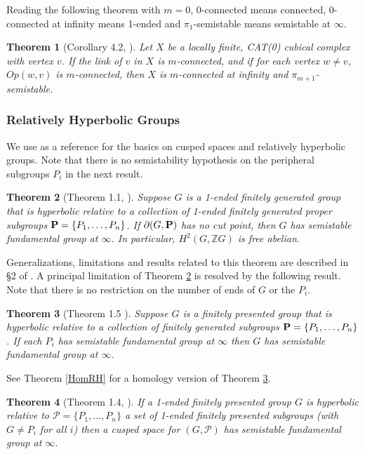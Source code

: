 \documentclass[12pt]{article}
\newtheorem{theorem}{Theorem}[subsection]
\begin{document}
Reading the following theorem with $m=0$, $0$-connected means connected, $0$-connected at infinity means 1-ended and $\pi_1$-semistable means semistable at $\infty$. 

\begin{theorem} [Corollary 4.2, \cite{BrM01}] Let $X$ be a locally finite, CAT(0) cubical complex with vertex $v$. If the link of $v$ in $X$ is $m$-connected, and if for each vertex $w\ne v$, $Op(w, v)$ is $m$-connected, then $X$ is $m$-connected at infinity and $\pi_{m+1}$-semistable.
\end{theorem}

\subsubsection{Relatively Hyperbolic Groups}\label{RHGs}
We use \cite{GMa08} as a reference for the basics on cusped spaces and relatively hyperbolic groups.
Note that there is no semistability hypothesis on the peripheral subgroups $P_i$ in the next result.

\begin{theorem} [Theorem 1.1, \cite{MS18}]\label{MainRH}  
Suppose $G$ is a 1-ended finitely generated group that is hyperbolic relative to a collection of 1-ended finitely generated proper subgroups ${\bf P}=\{P_1,\ldots, P_n\}$. If $\partial (G,{\bf P})$ has no cut point, then $G$ has semistable fundamental group at $\infty$. In particular, $H^2(G,\mathbb Z G)$ is free abelian. 
\end{theorem}

Generalizations, limitations and results related to this theorem are described in \S 2 of \cite{MS18}. A principal limitation of Theorem \ref{MainRH} is resolved by the following result. Note that there is no restriction on the number of ends of $G$ or the $P_i$.

\begin{theorem} [Theorem 1.5 \cite{HM20}] \label{HMSSMain}   
Suppose $G$ is a  finitely presented group that is hyperbolic relative to a collection of finitely generated subgroups ${\bf P}=\{P_1,\ldots, P_n\}$. If each $P_i$ has semistable fundamental group at $\infty$ then $G$ has semistable fundamental group at $\infty$.
\end{theorem}

See Theorem \ref{HomRH} for a homology version of Theorem \ref{HMSSMain}. 


\begin{theorem} [Theorem 1.4, \cite {MS19}]\label{MS-SS}   
If a 1-ended finitely presented group $G$ is hyperbolic relative to $\mathcal P=\{P_1,\ldots ,P_n\}$ a set of 1-ended finitely presented subgroups (with $G\ne P_i$ for all $i$) then a cusped space for $(G,\mathcal P)$ has semistable fundamental group at $\infty$. 
\end{theorem}
\end{document}
